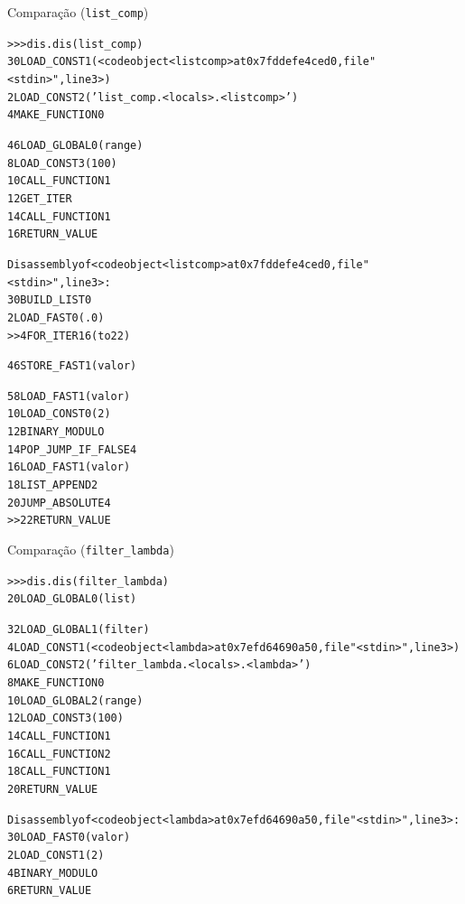 \documentclass[11pt]{beamer}
\begin{document}
\begin{frame}[fragile]{Comparação (\texttt{list\_comp})}
\vspace*{-.25cm}
  \begin{alltt}\tiny
>>> dis.dis(list_comp)
  3           0 LOAD_CONST               1 (<code object <listcomp> at 0x7fddefe4ced0, file "<stdin>", line 3>)
              2 LOAD_CONST               2 ('list_comp.<locals>.<listcomp>')
              4 MAKE_FUNCTION            0

  4           6 LOAD_GLOBAL              0 (range)
              8 LOAD_CONST               3 (100)
             10 CALL_FUNCTION            1
             12 GET_ITER
             14 CALL_FUNCTION            1
             16 RETURN_VALUE

Disassembly of <code object <listcomp> at 0x7fddefe4ced0, file "<stdin>", line 3>:
  3           0 BUILD_LIST               0
              2 LOAD_FAST                0 (.0)
        >>    4 FOR_ITER                16 (to 22)

  4           6 STORE_FAST               1 (valor)

  5           8 LOAD_FAST                1 (valor)
             10 LOAD_CONST               0 (2)
             12 BINARY_MODULO
             14 POP_JUMP_IF_FALSE        4
             16 LOAD_FAST                1 (valor)
             18 LIST_APPEND              2
             20 JUMP_ABSOLUTE            4
        >>   22 RETURN_VALUE
\end{alltt}
\end{frame}

\begin{frame}[fragile]{Comparação (\texttt{filter\_lambda})}
\vspace*{-.25cm}
  \begin{alltt}\tiny
>>> dis.dis(filter_lambda)
  2           0 LOAD_GLOBAL              0 (list)

  3           2 LOAD_GLOBAL              1 (filter)
              4 LOAD_CONST               1 (<code object <lambda> at 0x7efd64690a50, file "<stdin>", line 3>)
              6 LOAD_CONST               2 ('filter_lambda.<locals>.<lambda>')
              8 MAKE_FUNCTION            0
             10 LOAD_GLOBAL              2 (range)
             12 LOAD_CONST               3 (100)
             14 CALL_FUNCTION            1
             16 CALL_FUNCTION            2
             18 CALL_FUNCTION            1
             20 RETURN_VALUE

Disassembly of <code object <lambda> at 0x7efd64690a50, file "<stdin>", line 3>:
  3           0 LOAD_FAST                0 (valor)
              2 LOAD_CONST               1 (2)
              4 BINARY_MODULO
              6 RETURN_VALUE
\end{alltt}
\end{frame}
\end{document}
